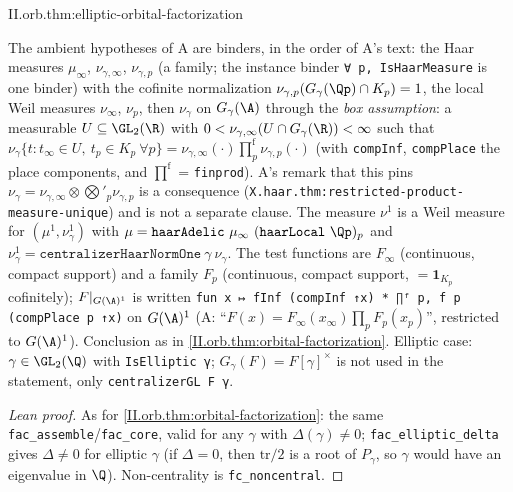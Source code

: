 \begin{tfformal}{II.orb.thm:elliptic-orbital-factorization}
\begin{tffidelity}
The ambient hypotheses of A are binders, in the order of A's text: the Haar measures $\mu_\infty$, $\nu_{\gamma,\infty}$, $\nu_{\gamma,p}$ (a family; the instance binder \texttt{∀ p, IsHaarMeasure} is one binder) with the cofinite normalization $\nu_{\gamma,p}(G_\gamma(\Qp)\cap K_p)=1$, the local Weil measures $\nu_\infty$, $\nu_p$, then $\nu_\gamma$ on $G_\gamma(\A)$ through the \emph{box assumption}: a measurable $U\subseteq\GL_2(\R)$ with $0<\nu_{\gamma,\infty}(U\cap G_\gamma(\R))<\infty$ such that $\nu_\gamma\{t:t_\infty\in U,\ t_p\in K_p\ \forall p\}=\nu_{\gamma,\infty}(\cdot)\prod^{\mathrm f}_p\nu_{\gamma,p}(\cdot)$ (with \texttt{compInf}, \texttt{compPlace} the place components, and $\prod^{\mathrm f}$ = \texttt{finprod}). A's remark that this pins $\nu_\gamma=\nu_{\gamma,\infty}\otimes\bigotimes'_p\nu_{\gamma,p}$ is a consequence (\texttt{X.haar.thm:restricted-product-measure-unique}) and is not a separate clause. The measure $\nu^1$ is a Weil measure for $(\mu^1,\nu_\gamma^1)$ with $\mu=\texttt{haarAdelic}\ \mu_\infty\ (\texttt{haarLocal}\ \Qp)_p$ and $\nu^1_\gamma=\texttt{centralizerHaarNormOne}\ \gamma\ \nu_\gamma$. The test functions are $F_\infty$ (continuous, compact support) and a family $F_p$ (continuous, compact support, $=\mathbf 1_{K_p}$ cofinitely); $F|_{G(\A)^1}$ is written \texttt{fun x ↦ fInf (compInf ↑x) * ∏ᶠ p, f p (compPlace p ↑x)} on $G(\A)^1$ (A: ``$F(x)=F_\infty(x_\infty)\prod_pF_p(x_p)$'', restricted to $G(\A)^1$). Conclusion as in \cref{II.orb.thm:orbital-factorization}. Elliptic case: $\gamma\in\GL_2(\Q)$ with \texttt{IsElliptic γ}; $G_\gamma(F)=F[\gamma]^\times$ is not used in the statement, only \texttt{centralizerGL F γ}.
\end{tffidelity}
\end{tfformal}
\begin{proof}[Lean proof]
As for \cref{II.orb.thm:orbital-factorization}: the same \texttt{fac\_assemble}/\texttt{fac\_core}, valid for any $\gamma$ with $\Delta(\gamma)\ne0$; \texttt{fac\_elliptic\_delta} gives $\Delta\ne0$ for elliptic $\gamma$ (if $\Delta=0$, then $\mathrm{tr}/2$ is a root of $P_\gamma$, so $\gamma$ would have an eigenvalue in $\Q$). Non-centrality is \texttt{fc\_noncentral}.
\end{proof}



